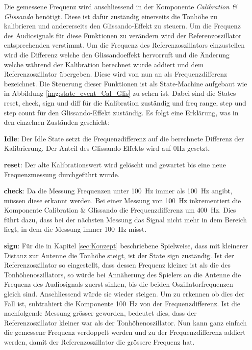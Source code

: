 Die gemessene Frequenz wird anschliessend in der Komponente \textit{Calibration \& Glissando} benötigt. Diese ist dafür zuständig einerseits die Tonhöhe zu kalibrieren und andererseits den Glissando-Effekt zu steuern. Um die Frequenz des Audiosignals für diese Funktionen zu verändern  wird der Referenzoszillator entsprechenden verstimmt.  Um die Frequenz des Referenzoszillators einzustellen wird die Differenz welche den Glissandoeffekt hervorruft und die Änderung welche während der Kalibration berechnet wurde addiert und dem Referenzoszillator übergeben. Diese wird von nun an als Frequenzdifferenz bezeichnet. Die Steuerung dieser Funktionen ist als State-Machine aufgebaut wie in Abbildung \ref{img:state_event_Cal_Glis} zu sehen ist. 
Dabei sind die States reset, check, sign und diff für die Kalibration zuständig und freq range, step und step count für den Glissando-Effekt zuständig. Es folgt eine Erklärung, was in den einzelnen Zuständen geschieht:

\textbf{Idle}:
Der Idle State setzt die Frequenzdifferenz auf die berechnete Differenz der Kalibrierung. Der Anteil des Glissando-Effekts wird auf 0Hz gesetzt.

\textbf{reset}:
Der alte Kalibrationswert wird gelöscht und gewartet bis eine neue Frequenzmessung durchgeführt wurde.

\textbf{check}:
Da die Messung Frequenzen unter \SI{100}{Hz} immer als \SI{100}{Hz} angibt, müssen diese erkannt werden. Bei einer Messung von \SI{100}{Hz} inkrementiert die Komponente Calibration \& Glissando die Frequenzdifferenz um \SI{400}{Hz}. Dies führt dazu, dass bei der nächsten Messung das Signal nicht mehr in dem Bereich liegt, in dem die Messung immer \SI{100}{Hz} misst.

\textbf{sign}:
Für die in Kapitel \ref{sec:Konzept} beschriebene Spielweise, dass mit kleinerer Distanz zur Antenne die Tonhöhe steigt, ist der State sign zuständig. Ist der Referenzoszillator so eingestellt, dass dessen Frequenz kleiner ist als die des Tonhöhenoszillators, so würde bei Annäherung des Spielers an die Antenne die Frequenz des Audiosignals zuerst sinken, bis die beiden Oszillatorfrequenzen gleich sind. Anschliessend würde sie wieder steigen. Um zu erkennen ob dies der Fall ist, subtrahiert die Komponente \SI{100}{Hz} von der Frequenzdifferenz. Ist die nachfolgende Messung grösser geworden, bedeutet dies, dass der Referenzoszillator kleiner war als der Tonhöhenoszillator. Nun kann ganz einfach die gemessene Frequenz verdoppelt werden und zu der Frequenzdifferenz addiert werden, damit der Referenzoszillator die grössere Frequenz hat.

